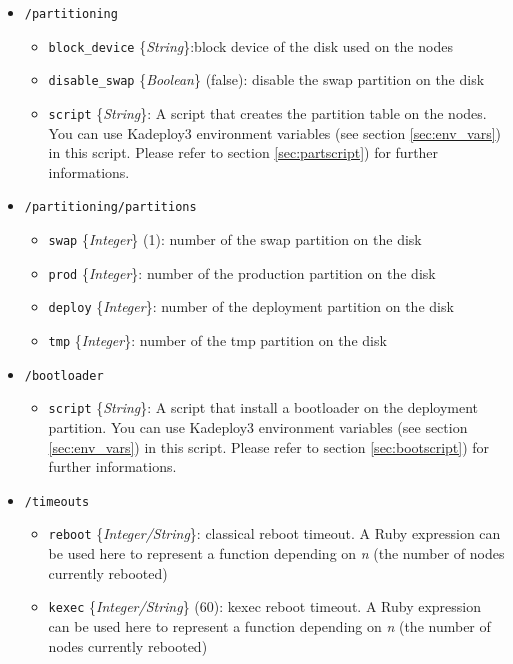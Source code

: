 \documentclass[a4wide,10pt,oneside]{book}
\newcommand{\ypath}[1]{\texttt{#1}}
\newcommand{\yfield}[2]{\texttt{#1} {\small\{{\emph{#2}}\}}:}
\newcommand{\yfieldd}[3]{\texttt{#1} {\small\{{\emph{#2}}\}} {\small(}#3{\small)}:}
\begin{document}
\begin{itemize}
  \item \ypath{/partitioning}
  \begin{itemize}
    \item \yfield{block\_device}{String}block device of the disk used on the nodes
    \item \yfieldd{disable\_swap}{Boolean}{false} disable the swap partition on the disk
    \item \yfield{script}{String} A script that creates the partition table on the nodes. You can use Kadeploy3 environment variables (see section \ref{sec:env_vars}) in this script. Please refer to section \ref{sec:partscript}) for further informations.
  \end{itemize}

  \item \ypath{/partitioning/partitions}
  \begin{itemize}
    \item \yfieldd{swap}{Integer}{1} number of the swap partition on the disk
    \item \yfield{prod}{Integer} number of the production partition on the disk
    \item \yfield{deploy}{Integer} number of the deployment partition on the disk
    \item \yfield{tmp}{Integer} number of the tmp partition on the disk
  \end{itemize}

  \item \ypath{/bootloader}
  \begin{itemize}
    \item \yfield{script}{String} A script that install a bootloader on the deployment partition. You can use Kadeploy3 environment variables (see section \ref{sec:env_vars}) in this script. Please refer to section \ref{sec:bootscript}) for further informations.
  \end{itemize}

  \item \ypath{/timeouts}
  \begin{itemize}
    \item \yfield{reboot}{Integer/String} classical reboot timeout. A Ruby expression can be used here to represent a function depending on \emph{n} (the number of nodes currently rebooted)
    \item \yfieldd{kexec}{Integer/String}{60} kexec reboot timeout. A Ruby expression can be used here to represent a function depending on \emph{n} (the number of nodes currently rebooted)
  \end{itemize}


\end{itemize}
\end{document}
